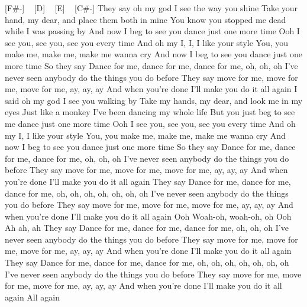 [F#-] ~ [D] ~ [E] ~ [C#-]
They say oh my god I see the way you shine
Take your hand, my dear, and place them both in mine
You know you stopped me dead while I was passing by
And now I beg to see you dance just one more time
Ooh I see you, see you, see you every time
And oh my I, I, I like your style
You, you make me, make me, make me wanna cry
And now I beg to see you dance just one more time
So they say
Dance for me, dance for me, dance for me, oh, oh, oh
I've never seen anybody do the things you do before
They say move for me, move for me, move for me, ay, ay, ay
And when you're done I'll make you do it all again
I said oh my god I see you walking by
Take my hands, my dear, and look me in my eyes
Just like a monkey I've been dancing my whole life
But you just beg to see me dance just one more time
Ooh I see you, see you, see you every time
And oh my I, I like your style
You, you make me, make me, make me wanna cry
And now I beg to see you dance just one more time
So they say
Dance for me, dance for me, dance for me, oh, oh, oh
I've never seen anybody do the things you do before
They say move for me, move for me, move for me, ay, ay, ay
And when you're done I'll make you do it all again
They say
Dance for me, dance for me, dance for me, oh, oh, oh, oh, oh, oh, oh
I've never seen anybody do the things you do before
They say move for me, move for me, move for me, ay, ay, ay
And when you're done I'll make you do it all again
Ooh
Woah-oh, woah-oh, oh
Ooh
Ah ah, ah
They say
Dance for me, dance for me, dance for me, oh, oh, oh
I've never seen anybody do the things you do before
They say move for me, move for me, move for me, ay, ay, ay
And when you're done I'll make you do it all again
They say
Dance for me, dance for me, dance for me, oh, oh, oh, oh, oh, oh, oh
I've never seen anybody do the things you do before
They say move for me, move for me, move for me, ay, ay, ay
And when you're done I'll make you do it all again
All again